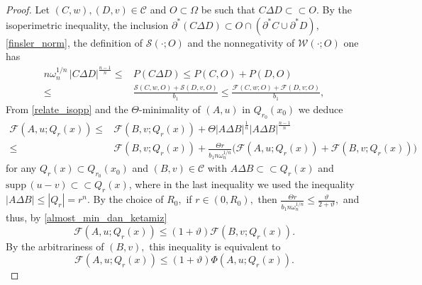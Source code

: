 \documentclass[reqno]{amsart}
\numberwithin{equation}{section}
\theoremstyle{plain}
\theoremstyle{definition}
\newcommand{\cS}{\mathcal{S}}
\newcommand{\cF}{\mathcal{F}}
\newcommand{\cW}{\mathcal{W}}
\newcommand{\p}{\partial}
\newcommand{\bound}{b}
\newcommand{\strictlyincluded}{\subset\subset}
\newcommand{\supp}{\mathrm{supp}\,}
\newcommand{\openset}{O}
\newcommand{\admissible}{\mathcal{C}}
\begin{document}
\begin{proof}
Let $(C,w),(D,v)\in\admissible $ and $\openset\subset\Omega$ be such that $C\Delta D\strictlyincluded \openset.$ 
By the isoperimetric inequality, the inclusion $\p^*(C\Delta D) \subset \openset\cap (\p^*C\cup\p^*D),$ \eqref{finsler_norm}, the definition of $\cS(\cdot;\openset)$ and the nonnegativity of $\cW(\cdot;\openset)$ one has
%
\begin{align}\label{relate_isopp}
n\omega_n^{1/n}\,|C\Delta D|^{\frac{n-1}{n}} \le  & P(C\Delta D) \le P(C,\openset) + P(D,\openset)\nonumber\\
\le &\frac{\cS(C,w,\openset) + \cS(D,v,\openset)}{\bound_1} \le \frac{\cF(C,w;\openset) + \cF(D,v;\openset)}{\bound_1},
\end{align}
%
From \eqref{relate_isopp} and the $\Theta$-minimality of $(A,u)$ in $Q_{r_0}(x_0)$ we deduce 
\begin{align}\label{almost_min_dan_ketamiz}
\!\cF(A,u;Q_r(x)) \le & \cF(B,v;Q_r(x)) + \Theta|A\Delta B|^\frac{1}{n}|A\Delta B|^\frac{n-1}{n}\nonumber \\
\le & \cF(B,v;Q_r(x)) + \frac{\Theta r}{ \bound_1 n\omega_n^{1/n}}\Big(\cF(A,u;Q_r(x)) + \cF(B,v;Q_r(x))\Big)  
\end{align}
%
for any $Q_r(x)\subset Q_{r_0}(x_0)$ and $(B,v)\in \admissible $ with $A\Delta B\strictlyincluded Q_r(x)$ and $\supp(u-v)\strictlyincluded Q_r(x)$, where in the last inequality we used the inequality $|A\Delta B| \le |Q_r|= r^n.$
%
By the choice of $R_0,$ if $r\in(0,R_0),$ then $\frac{\Theta r}{\bound_1 n\omega_n^{1/n}} \le \frac{\vartheta}{2+\vartheta},$ and thus, by \eqref{almost_min_dan_ketamiz} 
\begin{equation*}
\cF(A,u;Q_r(x)) \le (1+ \vartheta)\cF(B,v;Q_r(x)).
\end{equation*}
%
By the arbitrariness of $(B,v),$ this inequality is equivalent to
%
\begin{equation}\label{almost_minimal_mish}
\cF(A,u;Q_r(x)) \le (1+ \vartheta)\Phi(A,u;Q_r(x)). 
\end{equation}
%


\end{proof}
\end{document}
